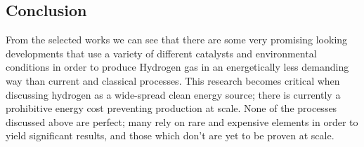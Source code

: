 \documentclass[a4paper]{article}
\begin{document}
	\subsection*{Conclusion}%
	\label{sub:conclusion}
	
	From the selected works we can see that there are some very promising looking developments that use a variety of different catalysts and environmental conditions in order to produce Hydrogen gas in an energetically less demanding way than current and classical processes. This research becomes critical when discussing hydrogen as a wide-spread clean energy source; there is currently a prohibitive energy cost preventing production at scale. None of the processes discussed above are perfect; many rely on rare and expensive elements in order to yield significant results, and those which don’t are yet to be proven at scale. 
\end{document}
